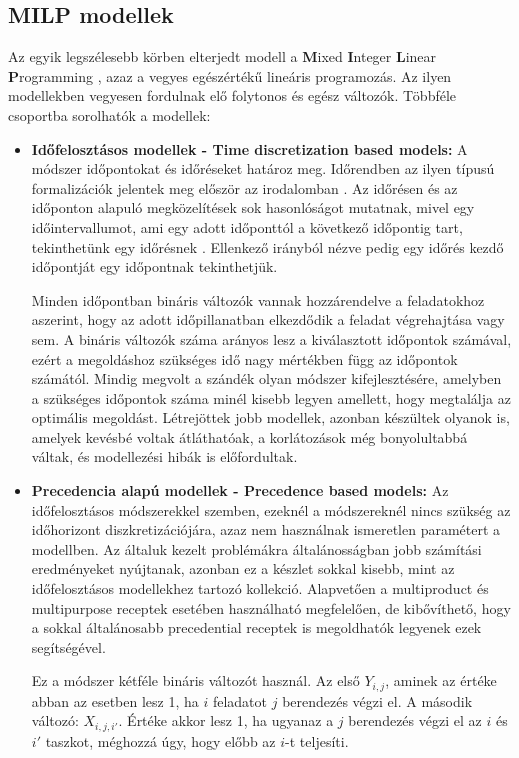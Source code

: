 \subsection{MILP modellek}
Az egyik legszélesebb körben elterjedt modell a \textbf{M}ixed \textbf{I}nteger \textbf{L}inear \textbf{P}rogramming \cite{Mendez2006} \cite{Floudas2004}, azaz a vegyes egészértékű lineáris programozás.
Az ilyen modellekben vegyesen fordulnak elő folytonos és egész változók. Többféle csoportba sorolhatók a modellek:
\begin{itemize}
  \item[] \textbf{Időfelosztásos modellek - Time discretization based models:}
  A módszer időpontokat és időréseket határoz meg.
  Időrendben az ilyen típusú formalizációk jelentek meg először az irodalomban \cite{kondili}.
  Az időrésen és az időponton alapuló megközelítések sok hasonlóságot mutatnak, mivel egy időintervallumot, ami egy adott időponttól a következő időpontig tart, tekinthetünk egy időrésnek \cite{susarla}.
  Ellenkező irányból nézve pedig egy időrés kezdő időpontját egy időpontnak tekinthetjük.  
  
Minden időpontban bináris változók vannak hozzárendelve a feladatokhoz aszerint, hogy az adott időpillanatban elkezdődik a feladat végrehajtása vagy sem.
A bináris változók száma arányos lesz a kiválasztott időpontok számával, ezért a megoldáshoz szükséges idő nagy mértékben függ az időpontok számától.
Mindig megvolt a szándék olyan módszer kifejlesztésére, amelyben a szükséges időpontok száma minél kisebb legyen amellett, hogy megtalálja az optimális megoldást.
Létrejöttek jobb modellek, azonban készültek olyanok is, amelyek kevésbé voltak átláthatóak, a korlátozások még bonyolultabbá váltak, és modellezési hibák is előfordultak.
  
  \item[] \textbf{Precedencia alapú modellek - Precedence based models:}
  Az időfelosztásos módszerekkel szemben, ezeknél a módszereknél nincs szükség az időhorizont diszkretizációjára, azaz nem használnak ismeretlen paramétert a modellben.
  Az általuk kezelt problémákra általánosságban jobb számítási eredményeket nyújtanak, azonban ez a készlet sokkal kisebb, mint az időfelosztásos modellekhez tartozó kollekció.
  Alapvetően a multiproduct és multipurpose receptek esetében használható megfelelően, de kibővíthető, hogy a sokkal általánosabb precedential receptek is megoldhatók legyenek ezek segítségével. 
  
Ez a módszer kétféle bináris változót használ.
Az első $Y_{i,j}$, aminek az értéke abban az esetben lesz 1, ha $i$ feladatot $j$ berendezés végzi el.
A második változó: $X_{i,j,i'}$.
Értéke akkor lesz 1, ha ugyanaz a $j$ berendezés végzi el az $i$ és $i'$ taszkot, méghozzá úgy, hogy előbb az $i$-t teljesíti. 
\end{itemize}

